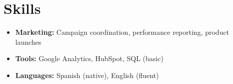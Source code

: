 \documentclass[letterpaper,11pt]{article}
\begin{document}
\section{Skills}
\begin{itemize}[label={}]
  \item \textbf{Marketing:} Campaign coordination, performance reporting, product launches
  \item \textbf{Tools:} Google Analytics, HubSpot, SQL (basic)
  \item \textbf{Languages:} Spanish (native), English (fluent)
\end{itemize}
\end{document}
